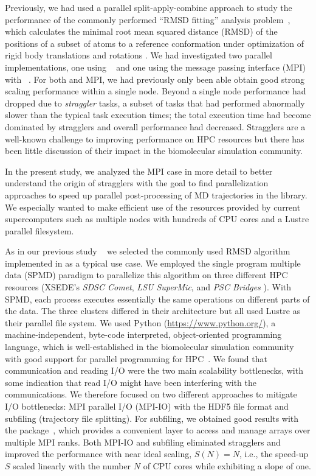 Previously, we had used a parallel split-apply-combine  approach to study the performance of the commonly performed ``RMSD fitting'' analysis problem~\cite{Khoshlessan:2017ab, ICCP-2018}, which calculates the minimal root mean squared distance (RMSD) of the positions of a subset of atoms to a reference conformation under optimization of rigid body translations and rotations \cite{Liu:2010kx, Lea96, Mura:2014kx}.
We had investigated two parallel implementations, one using ~\cite{Rocklin:2015aa} and one using the message passing interface (MPI) with ~\cite{Dalcin:2011aa, Dalcin:2005aa}. 
For both  and MPI, we had previously only been able obtain good strong scaling performance within a single node.
Beyond a single node performance had dropped due to \emph{straggler} tasks, a subset of tasks that had performed abnormally slower than the typical task execution times; the total execution time had become dominated by stragglers and overall performance had decreased.
Stragglers are a well-known challenge to improving performance on HPC resources \cite{Garraghan2016} but there has been little discussion of their impact in the biomolecular simulation community.

In the present study, we analyzed the MPI case in more detail to better understand the origin of stragglers with the goal to find  parallelization approaches to speed up parallel post-processing of MD trajectories in the  library.
We especially wanted to make efficient use of the resources provided by current supercomputers such as multiple nodes with hundreds of CPU cores and a Lustre parallel filesystem.

As in our previous study ~\cite{Khoshlessan:2017ab} we selected the commonly used RMSD algorithm implemented in  as a typical use case.
We employed the single program multiple data (SPMD) paradigm to parallelize this algorithm on three different HPC resources (XSEDE's \emph{SDSC Comet}, \emph{LSU SuperMic}, and \emph{PSC Bridges} \cite{xsede}).
With SPMD, each process executes essentially the same operations on different parts of the data.
The three clusters differed in their architecture but all used Lustre as their parallel file system.
We used Python (\url{https://www.python.org/}), a machine-independent, byte-code interpreted, object-oriented programming language, which is well-established in the biomolecular simulation community with good support for parallel programming for HPC~\cite{Dalcin:2011aa, GAiN}. 
We found that communication and reading I/O were the two main scalability bottlenecks, with some indication that read I/O might have been interfering with the communications.
We therefore focused on two different approaches to mitigate I/O bottlenecks: MPI parallel I/O (MPI-IO) with the HDF5 file format and subfiling (trajectory file splitting).
For subfiling, we obtained good results with the  package~\cite{GA, GAiN}, which provides a convenient layer to access and manage arrays over multiple MPI ranks.
Both MPI-IO and subfiling eliminated stragglers and improved the performance with near ideal scaling, $S(N) = N$, i.e., the speed-up $S$ scaled linearly with the number $N$ of CPU cores while exhibiting a slope of one.

